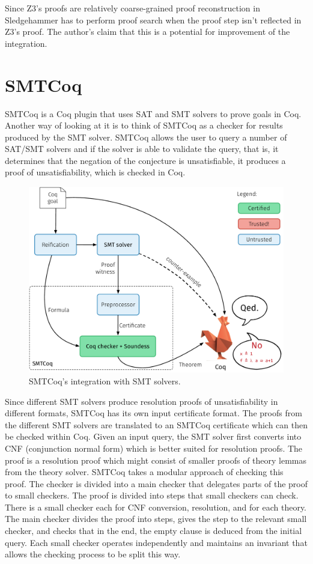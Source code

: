 \documentclass{article}
\begin{document}
		Since Z3's proofs are relatively coarse-grained
		proof reconstruction in Sledgehammer has to perform
		proof search when the proof step isn't reflected 
		in Z3's proof. The author's claim that this is 
		a potential for improvement of the integration.
		
\section{SMTCoq}
\label{sec:cert}
	SMTCoq is a Coq plugin that uses SAT and SMT solvers to 
	prove goals in Coq. Another way of looking at it is 
	to think of SMTCoq as a checker for results produced 
	by the SMT solver. SMTCoq allows the user to query 
	a number of SAT/SMT solvers and if the solver is able 
	to validate the query, that is, it determines that 
	the negation of the conjecture is unsatisfiable, it 
	produces a proof of unsatisfiability, which is checked 
	in Coq.
	
	\begin{figure}[t]
		\centering
		\includegraphics[scale=0.4]{tactic_cex.pdf}
		\caption{SMTCoq's integration with SMT solvers.}
		\label{fig:smtcoq}
	\end{figure}
	
	Since different SMT solvers produce resolution 
	proofs of unsatisfiability in different formats, 
	SMTCoq has its own input certificate format. 
	The proofs from the different SMT solvers are 
	translated to an SMTCoq certificate which 
	can then be checked within Coq. Given an input 
	query, the SMT solver first converts into CNF
	(conjunction normal form) which is better 
	suited for resolution proofs. The proof is a 
	resolution proof which might consist of smaller proofs 
	of theory lemmas from the theory solver. 
	SMTCoq takes a modular approach of checking this proof.
	The checker is divided into a main checker that 
	delegates parts of the proof to small checkers. The proof 
	is divided into steps that small checkers can check.
	There is a small checker each for CNF conversion, 
	resolution, and for each theory. The main checker divides the 
	proof into steps, gives the step to the relevant small 
	checker, and checks that in the end, the empty 
	clause is deduced from the initial query. Each small 
	checker operates independently and maintains an invariant
	that allows the checking process to be split this way.
	
\end{document}
